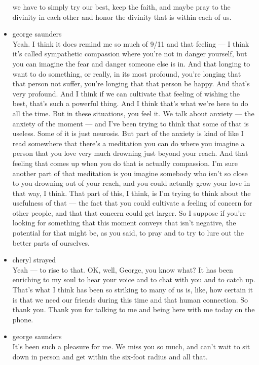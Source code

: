 \begin{itemize}
  we have to simply try our best, keep the faith, and maybe pray to the
  divinity in each other and honor the divinity that is within each of
  us.
\item
  george saunders\\
  Yeah. I think it does remind me so much of 9/11 and that feeling --- I
  think it's called sympathetic compassion where you're not in danger
  yourself, but you can imagine the fear and danger someone else is in.
  And that longing to want to do something, or really, in its most
  profound, you're longing that that person not suffer, you're longing
  that that person be happy. And that's very profound. And I think if we
  can cultivate that feeling of wishing the best, that's such a powerful
  thing. And I think that's what we're here to do all the time. But in
  these situations, you feel it. We talk about anxiety --- the anxiety
  of the moment --- and I've been trying to think that some of that is
  useless. Some of it is just neurosis. But part of the anxiety is kind
  of like I read somewhere that there's a meditation you can do where
  you imagine a person that you love very much drowning just beyond your
  reach. And that feeling that comes up when you do that is actually
  compassion. I'm sure another part of that meditation is you imagine
  somebody who isn't so close to you drowning out of your reach, and you
  could actually grow your love in that way, I think. That part of this,
  I think, is I'm trying to think about the usefulness of that --- the
  fact that you could cultivate a feeling of concern for other people,
  and that that concern could get larger. So I suppose if you're looking
  for something that this moment conveys that isn't negative, the
  potential for that might be, as you said, to pray and to try to lure
  out the better parts of ourselves.
\item
  cheryl strayed\\
  Yeah --- to rise to that. OK, well, George, you know what? It has been
  enriching to my soul to hear your voice and to chat with you and to
  catch up. That's what I think has been so striking to many of us is,
  like, how certain it is that we need our friends during this time and
  that human connection. So thank you. Thank you for talking to me and
  being here with me today on the phone.
\item
  george saunders\\
  It's been such a pleasure for me. We miss you so much, and can't wait
  to sit down in person and get within the six-foot radius and all that.

\end{itemize}

